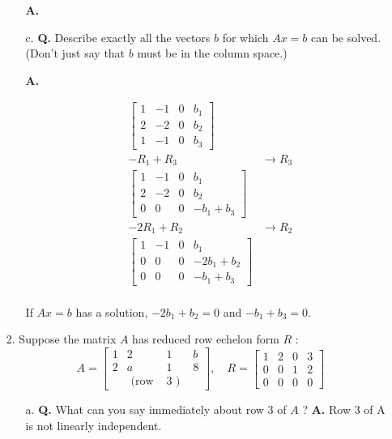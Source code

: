 \documentclass[main.tex]{subfiles}
\begin{document}
\begin{enumerate}
\begin{enumerate}
    \textbf{A.}
    
    \item [c.] \textbf{Q.} Describe exactly all the vectors $b$ for which $A x=b$ can be solved. (Don't just say that $b$ must be in the column space.) 
    
    \textbf{A.}
    
    $$
    \begin{aligned}
    \left[\begin{array}{lll|l}
    1 & -1 & 0 & b_1\\
    2 & -2 & 0 & b_2\\
    1 & -1 & 0 & b_3
    \end{array}\right]&\\
    -R_1 + R_3 &\rightarrow R_3\\
    \left[\begin{array}{lll|l}
    1 & -1 & 0 & b_1\\
    2 & -2 & 0 & b_2\\
    0 & 0 & 0 & -b_1 + b_3
    \end{array}\right]&\\
    -2R_1 + R_2 &\rightarrow R_2\\
    \left[\begin{array}{lll|l}
    1 & -1 & 0 & b_1\\
    0 & 0 & 0 & -2b_1 + b_2\\
    0 & 0 & 0 & -b_1 + b_3
    \end{array}\right]&\\
    \end{aligned}
    $$
    
    If $Ax=b$ has a solution, $-2b_1 + b_2 = 0$ and $-b_1 + b_3=0$.
    
    
\end{enumerate}

\item [2.] Suppose the matrix $A$ has reduced row echelon form $R$ :
$$
A=\left[\begin{array}{cccc}
1 & 2 & 1 & b \\
2 & a & 1 & 8 \\
& \text { (row } & 3 \text { ) }
\end{array}\right], \quad R=\left[\begin{array}{llll}
1 & 2 & 0 & 3 \\
0 & 0 & 1 & 2 \\
0 & 0 & 0 & 0
\end{array}\right]
$$
\begin{enumerate}
    \item [a.] \textbf{Q.} What can you say immediately about row 3 of $A$ ? 
    \textbf{A.} Row 3 of A is not linearly independent.
    

\end{enumerate}
\end{enumerate}
\end{document}
